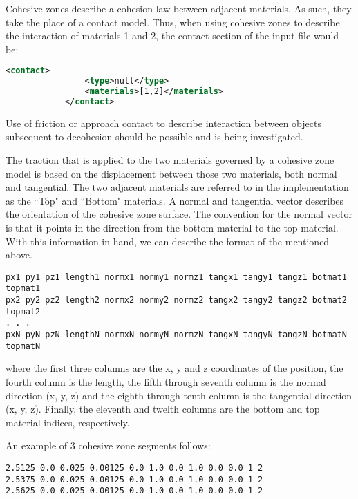 Cohesive zones describe a cohesion law between adjacent materials. As such,
they take the place of a contact model.  Thus, when using cohesive zones to
describe the interaction of materials 1 and 2, the contact section of the input
file would be:

\begin{lstlisting}[language=XML]
            <contact>
                <type>null</type>
                <materials>[1,2]</materials>
            </contact>
\end{lstlisting}

Use of friction or approach contact to describe interaction between objects
subsequent to decohesion should be possible and is being investigated.

The traction that is applied to the two materials governed by a
cohesive zone model is based on the displacement between those two materials,
both normal and tangential.  The two adjacent materials are referred to in the
implementation as the ``Top" and ``Bottom" materials.  A normal and tangential
vector describes the orientation of the cohesive zone surface.  The convention
for the normal vector is that it points in the direction from the bottom
material to the top material.  With this information in hand, we can describe
the format of the  mentioned above.

\begin{lstlisting}[backgroundcolor=\color{background}]
px1 py1 pz1 length1 normx1 normy1 normz1 tangx1 tangy1 tangz1 botmat1 topmat1
px2 py2 pz2 length2 normx2 normy2 normz2 tangx2 tangy2 tangz2 botmat2 topmat2
. . .
pxN pyN pzN lengthN normxN normyN normzN tangxN tangyN tangzN botmatN topmatN
\end{lstlisting}

where the first three columns are the x, y and z coordinates of the position, 
the fourth column is the length, the fifth through seventh column is the normal
direction (x, y, z) and the eighth through tenth column is the tangential
direction (x, y, z).  Finally, the eleventh and twelth columns are the bottom
and top material indices, respectively.

An example of 3 cohesive zone segments follows:

\begin{lstlisting}[backgroundcolor=\color{background}]
2.5125 0.0 0.025 0.00125 0.0 1.0 0.0 1.0 0.0 0.0 1 2
2.5375 0.0 0.025 0.00125 0.0 1.0 0.0 1.0 0.0 0.0 1 2
2.5625 0.0 0.025 0.00125 0.0 1.0 0.0 1.0 0.0 0.0 1 2
\end{lstlisting}

